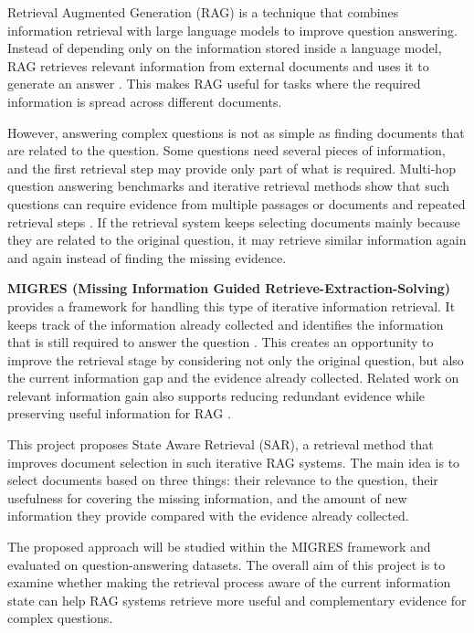 \documentclass[12pt,a4paper]{report}
\begin{document}
Retrieval Augmented Generation (RAG) is a technique that combines information retrieval with large language models to improve question answering. Instead of depending only on the information stored inside a language model, RAG retrieves relevant information from external documents and uses it to generate an answer \cite{lewis2020rag}. This makes RAG useful for tasks where the required information is spread across different documents.

However, answering complex questions is not as simple as finding documents that are related to the question. Some questions need several pieces of information, and the first retrieval step may provide only part of what is required. Multi-hop question answering benchmarks and iterative retrieval methods show that such questions can require evidence from multiple passages or documents and repeated retrieval steps \cite{yang2018hotpotqa,trivedi2022musique,yadav2020iterative}. If the retrieval system keeps selecting documents mainly because they are related to the original question, it may retrieve similar information again and again instead of finding the missing evidence.

\textbf{MIGRES (Missing Information Guided Retrieve-Extraction-Solving)} provides a framework for handling this type of iterative information retrieval. It keeps track of the information already collected and identifies the information that is still required to answer the question \cite{wang2025migres}. This creates an opportunity to improve the retrieval stage by considering not only the original question, but also the current information gap and the evidence already collected. Related work on relevant information gain also supports reducing redundant evidence while preserving useful information for RAG \cite{pickett2024better}.

This project proposes State Aware Retrieval (SAR), a retrieval method that improves document selection in such iterative RAG systems. The main idea is to select documents based on three things: their relevance to the question, their usefulness for covering the missing information, and the amount of new information they provide compared with the evidence already collected.

The proposed approach will be studied within the MIGRES framework and evaluated on question-answering datasets. The overall aim of this project is to examine whether making the retrieval process aware of the current information state can help RAG systems retrieve more useful and complementary evidence for complex questions.
\end{document}

